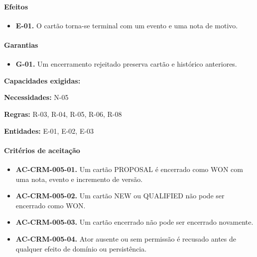 \documentclass[10pt,a4paper]{article}
\begin{document}
\paragraph{Efeitos}

\begin{itemize}

\item \textbf{E-01.} O cartão torna-se terminal com um evento e uma nota de motivo.

\end{itemize}

\paragraph{Garantias}

\begin{itemize}

\item \textbf{G-01.} Um encerramento rejeitado preserva cartão e histórico anteriores.

\end{itemize}

\textbf{Capacidades exigidas:}

\textbf{Necessidades:} N-05

\textbf{Regras:} R-03, R-04, R-05, R-06, R-08

\textbf{Entidades:} E-01, E-02, E-03

\paragraph{Critérios de aceitação}

\begin{itemize}

\item \textbf{AC-CRM-005-01.} Um cartão PROPOSAL é encerrado como WON com uma nota, evento e incremento de versão.

\item \textbf{AC-CRM-005-02.} Um cartão NEW ou QUALIFIED não pode ser encerrado como WON.

\item \textbf{AC-CRM-005-03.} Um cartão encerrado não pode ser encerrado novamente.

\item \textbf{AC-CRM-005-04.} Ator ausente ou sem permissão é recusado antes de qualquer efeito de domínio ou persistência.

\end{itemize}
\end{document}
